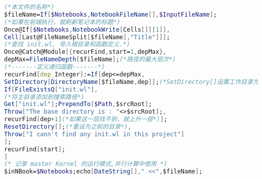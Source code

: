 \begin{lstlisting}[language=mathematica]
(*本文件的名称*)
$fileName=If[$Notebooks,NotebookFileName[],$InputFileName];
(*如果在前端执行，就刷新笔记本的标题*)
Once@If[$Notebooks,NotebookWrite[Cells[][[1]],
Cell[Last@FileNameSplit[$fileName],"Title"]]];
(*查找 init.wl, 导入根目录和函数定义.*)
Once@Catch@Module[{recurFind,start=1,depMax},
depMax=FileNameDepth[$fileName];(*路径的最大层次*)
(*-------定义递归函数-------*)
recurFind[dep_Integer]:=If[dep<=depMax,
SetDirectory[DirectoryName[$fileName,dep]];(*SetDirectory[]设置工作目录为家目录*)
If[FileExistsQ["init.wl"],
(*将主目录添加到搜索路径*)
Get["init.wl"];PrependTo[$Path,$srcRoot];
Throw["The base directory is : "<>$srcRoot];,
recurFind[dep+1](*如果这一层找不到，就上升一层*)];
ResetDirectory[];(*重设为之前的目录*),
Throw["I cann't find any init.wl in this project"]
];
recurFind[start];
]
(* 记录 master Kernel 的运行模式,并行计算中使用 *)
$inNBook=$Notebooks;echo[DateString[]," <<",$fileName];
\end{lstlisting}